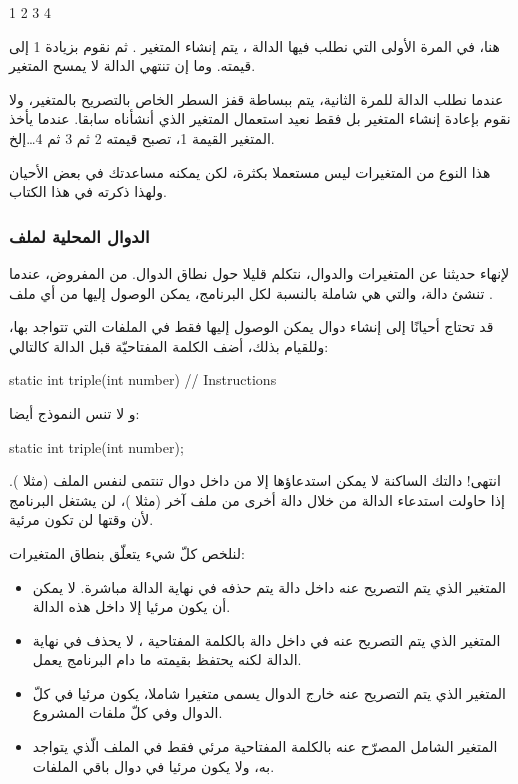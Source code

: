 \begin{Console}
1
2
3
4
\end{Console}

هنا، في المرة الأولى التي نطلب فيها الدالة
،
يتم إنشاء المتغير
.
ثم نقوم بزيادة 1 إلى قيمته. وما إن تنتهي الدالة لا يمسح المتغير.

عندما نطلب الدالة للمرة الثانية، يتم ببساطة قفز السطر الخاص بالتصريح بالمتغير، ولا نقوم بإعادة إنشاء المتغير بل فقط نعيد استعمال المتغير الذي أنشأناه سابقا. عندما يأخذ المتغير القيمة 1، تصبح قيمته 2 ثم 3 ثم 4\dots إلخ.

هذا النوع من المتغيرات ليس مستعملا بكثرة، لكن يمكنه مساعدتك في بعض الأحيان ولهذا ذكرته في هذا الكتاب.

\subsubsection{الدوال المحلية لملف}

لإنهاء حديثنا عن المتغيرات والدوال،  نتكلم قليلا حول نطاق الدوال. من المفروض، عندما تنشئ دالة، والتي هي شاملة بالنسبة لكل البرنامج، يمكن الوصول إليها من أي ملف
.

قد تحتاج أحيانًا إلى إنشاء دوال يمكن الوصول إليها فقط في الملفات التي تتواجد بها، وللقيام بذلك، أضف الكلمة المفتاحيّة
قبل الدالة كالتالي:

\begin{Csource}
static int triple(int number)
{
	// Instructions
}
\end{Csource}

و لا تنس النموذج أيضا:

\begin{Csource}
static int triple(int number);
\end{Csource}

انتهى! دالتك الساكنة
لا يمكن استدعاؤها إلا من داخل دوال تنتمى لنفس الملف (مثلا
).
إذا حاولت استدعاء الدالة
من خلال دالة أخرى من ملف آخر (مثلا
)،
لن يشتغل البرنامج لأن
وقتها لن تكون مرئية.

لنلخص كلّ شيء يتعلّق بنطاق المتغيرات:

\begin{itemize}
  \item المتغير الذي يتم التصريح عنه داخل دالة يتم حذفه في نهاية الدالة مباشرة. لا يمكن أن يكون مرئيا إلا داخل هذه الدالة.
  \item المتغير الذي  يتم التصريح عنه في داخل دالة بالكلمة المفتاحية
،
لا يحذف في نهاية الدالة لكنه يحتفظ بقيمته ما دام البرنامج يعمل.
  \item المتغير الذي يتم التصريح عنه خارج الدوال يسمى متغيرا شاملا، يكون مرئيا في كلّ الدوال وفي كلّ ملفات المشروع.
  \item  المتغير الشامل المصرّح عنه بالكلمة المفتاحية
مرئي فقط في الملف الّذي يتواجد به، ولا يكون مرئيا في دوال باقي الملفات.
\end{itemize}

